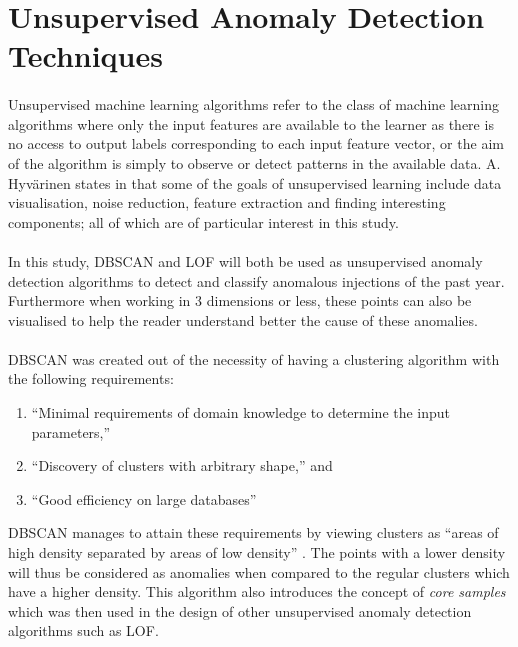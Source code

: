 


\section{Unsupervised Anomaly Detection Techniques}

\paragraph{ }Unsupervised machine learning algorithms refer to the class of machine learning algorithms where only the input features are available to the learner as there is no access to output labels corresponding to each input feature vector, or the aim of the algorithm is simply to observe or detect patterns in the available data. A. Hyv\"{a}rinen states in \cite{Hyvarinen2015} that some of the goals of unsupervised learning include data visualisation, noise reduction, feature extraction and finding interesting components; all of which are of particular interest in this study.

\paragraph{ }In this study, \ac{DBSCAN} and \ac{LOF} will both be used as unsupervised anomaly detection algorithms to detect and classify anomalous injections of the past year. Furthermore when working in 3 dimensions or less, these points can also be visualised to help the reader understand better the cause of these anomalies. 

\paragraph{ }\acs{DBSCAN} was created out of the necessity of having a clustering algorithm with the following requirements:
\begin{enumerate}
	\item ``Minimal requirements of domain knowledge to determine the input parameters,''
	\item ``Discovery of clusters with arbitrary shape,'' and
	\item ``Good efficiency on large databases'' \cite{Ester1996}
\end{enumerate}
\acs{DBSCAN} manages to attain these requirements by viewing clusters as ``areas of high density separated by areas of low density'' \cite{Sklearn2}. The points with a lower density will thus be considered as anomalies when compared to the regular clusters which have a higher density. This algorithm also introduces the concept of \textit{core samples} which was then used in the design of other unsupervised anomaly detection algorithms such as \acs{LOF}. 

